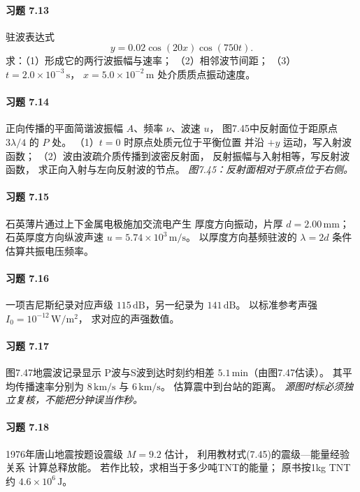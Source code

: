 \paragraph{习题 7.13}
驻波表达式
\[
 y=0.02\cos(20x)\cos(750t).
\]
求：（1）形成它的两行波振幅与速率；
（2）相邻波节间距；
（3）\(t=2.0\times10^{-3}\,\mathrm s\)，
\(x=5.0\times10^{-2}\,\mathrm m\)
处介质质点振动速度。

\paragraph{习题 7.14}
正向传播的平面简谐波振幅
\(A\)、频率 \(\nu\)、波速 \(u\)，
图7.45中反射面位于距原点
\(3\lambda/4\) 的 \(P\) 处。
（1）\(t=0\) 时原点处质元位于平衡位置
并沿 \(+y\) 运动，写入射波函数；
（2）波由波疏介质传播到波密反射面，
反射振幅与入射相等，写反射波函数，
求正向入射与左向反射波的节点。
\textit{图7.45：反射面相对于原点位于右侧。}

\paragraph{习题 7.15}
石英薄片通过上下金属电极施加交流电产生
厚度方向振动，片厚
\(d=2.00\,\mathrm{mm}\)；
石英厚度方向纵波声速
\(u=5.74\times10^3\,\mathrm{m/s}\)。
以厚度方向基频驻波的
\(\lambda=2d\) 条件估算共振电压频率。

\paragraph{习题 7.16}
一项吉尼斯纪录对应声级
\(115\,\mathrm{dB}\)，另一纪录为
\(141\,\mathrm{dB}\)。
以标准参考声强
\(I_0=10^{-12}\,\mathrm{W/m^2}\)，
求对应的声强数值。

\paragraph{习题 7.17}
图7.47地震波记录显示
P波与S波到达时刻约相差
\(5.1\,\mathrm{min}\)（由图7.47估读）。
其平均传播速率分别为
\(8\,\mathrm{km/s}\) 与
\(6\,\mathrm{km/s}\)。
估算震中到台站的距离。
\textit{源图时标必须独立复核，不能把分钟误当作秒。}

\paragraph{习题 7.18}
1976年唐山地震按题设震级
\(M=9.2\) 估计，
利用教材式(7.45)的震级—能量经验关系
计算总释放能。
若作比较，求相当于多少吨TNT的能量；
原书按1kg TNT约
\(4.6\times10^6\,\mathrm J\)。

